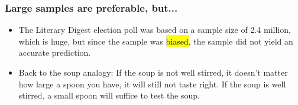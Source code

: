 \documentclass[slidestop,compress,mathserif]{beamer}
\begin{document}

\begin{frame}

	\frametitle{Large samples are preferable, but...}

	\begin{itemize}
		\item The Literary Digest election poll was based on a sample size of 2.4 million, which is huge, but since the sample was \hl{biased}, the sample did not yield an accurate prediction.
		\item Back to the soup analogy: If the soup is not well stirred, it doesn't matter how large a spoon you have, it will still not taste right. If the soup is well stirred, a small spoon will suffice to test the soup.
	\end{itemize}

\end{frame}





\end{document}
